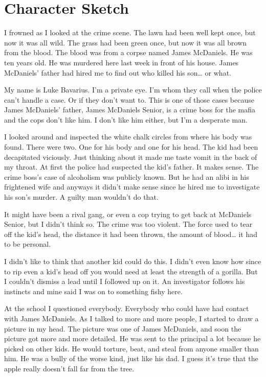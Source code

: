 \chapter{Character Sketch}



I frowned as I looked at the crime scene. The lawn had been well
kept once, but now it was all wild. The grass had been green once,
but now it was all brown from the blood. The blood was from a
corpse named James McDaniels. He was ten years old. He was murdered
here last week in front of his house. James McDaniels' father
had hired me to find out who killed his son{\ldots} or what.



My name is Luke Bavarius. I'm a private eye. I'm whom
they call when the police can't handle a case. Or if they
don't want to. This is one of those cases because James
McDaniels' father, James McDaniels Senior, is a crime boss
for the mafia and the cops don't like him. I don't like
him either, but I'm a desperate man.



I looked around and inspected the white chalk circles from where
his body was found. There were two. One for his body and one for
his head. The kid had been decapitated viciously. Just thinking
about it made me taste vomit in the back of my throat. At first the
police had suspected the kid's father. It makes sense. The
crime boss's case of alcoholism was publicly known. But he
had an alibi in his frightened wife and anyways it didn't
make sense since he hired me to investigate his son's murder.
A guilty man wouldn't do that.



It might have been a rival gang, or even a cop trying to get back
at McDaniels Senior, but I didn't think so. The crime was too
violent. The force used to tear off the kid's head, the
distance it had been thrown, the amount of blood{\ldots} it had to
be personal.



I didn't like to think that another kid could do this. I
didn't even know how since to rip even a kid's head off
you would need at least the strength of a gorilla. But I
couldn't dismiss a lead until I followed up on it. An
investigator follows his instincts and mine said I was on to
something fishy here.



At the school I questioned everybody. Everybody who could have had
contact with James McDaniels. As I talked to more and more people,
I started to draw a picture in my head. The picture was one of
James McDaniels, and soon the picture got more and more detailed.
He was sent to the principal a lot because he picked on other kids.
He would torture, beat, and steal from anyone smaller than him. He
was a bully of the worse kind, just like his dad. I guess
it's true that the apple really doesn't fall far from
the tree.



